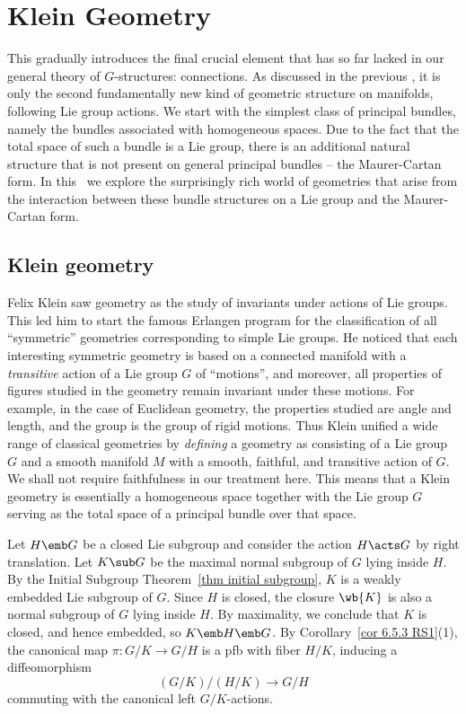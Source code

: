 \chapter{Klein Geometry}\label{chap: Klein geom}

This \partt{} gradually introduces the final crucial element that has so far lacked in our general theory of $G$-structures: connections. As discussed in the previous \chap, it is only the second fundamentally new kind of geometric structure on manifolds, following Lie group actions. We start with the simplest class of principal bundles, namely the bundles associated with homogeneous spaces. Due to the fact that the total space of such a bundle is a Lie group, there is an additional natural structure that is not present on general principal bundles -- the Maurer-Cartan form. In this \chap\ we explore the surprisingly rich world of geometries that arise from the interaction between these bundle structures on a Lie group and the Maurer-Cartan form.



\section{Klein geometry}

Felix Klein saw geometry as the study of invariants under actions of Lie groups. This led him to start the famous Erlangen program for the classification of all ``symmetric'' geometries corresponding to simple Lie groups. He noticed that each interesting symmetric geometry is based on a connected manifold with a \emph{transitive} action of a Lie group $G$ of ``motions'', and moreover, all properties of figures studied in the geometry remain invariant under these motions. For example, in the case of Euclidean geometry, the properties studied are angle and length, and the group is the group of rigid motions. Thus Klein unified a wide range of classical geometries by \emph{defining} a geometry as consisting of a Lie group $G$ and a smooth manifold $M$ with a smooth, faithful, and transitive action of $G$. We shall not require faithfulness in our treatment here. This means that a Klein geometry is essentially a homogeneous space together with the Lie group $G$ serving as the total space of a principal bundle over that space.

Let $H\emb G$ be a closed Lie subgroup and consider the action $H\acts G$ by right translation. Let $K\sub G$ be the maximal normal subgroup of $G$ lying inside $H$. By the Initial Subgroup Theorem~\ref{thm initial subgroup}, $K$ is a weakly embedded Lie subgroup of $G$. Since $H$ is closed, the closure $\wb{K}$ is also a normal subgroup of $G$ lying inside $H$. By maximality, we conclude that $K$ is closed, and hence embedded, so $K\emb H\emb G$. By Corollary~\ref{cor 6.5.3 RS1}(1), the canonical map $\pi:G\slash K\to G\slash H$ is a \gls{pfb} with fiber $H\slash K$, inducing a diffeomorphism
\[(G\slash K)\slash (H\slash K)\to G\slash H\]
commuting with the canonical left $G\slash K$-actions.

